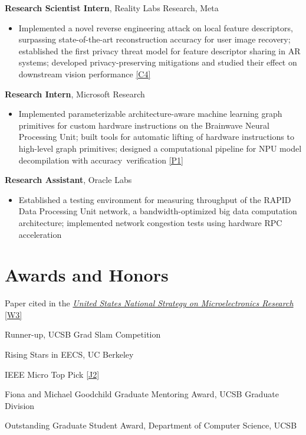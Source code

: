 \documentclass[11pt,letterpaper]{article}
\newcommand{\pref}[1]{\hyperlink{pub:#1}{[#1]}}
\begin{document}
\begin{yearlist}
\item[2020--21] \textbf{Research Scientist Intern}, Reality Labs Research, Meta
  \begin{itemize}
  \item Implemented a novel reverse engineering attack on local feature descriptors, surpassing state-of-the-art reconstruction accuracy for user image recovery; established the first privacy threat model for feature descriptor sharing in AR systems; developed privacy-preserving mitigations and studied their effect on downstream vision performance \pref{C4}
  \end{itemize}
\item[2018] \textbf{Research Intern}, Microsoft Research
  \begin{itemize}
  \item Implemented parameterizable architecture-aware machine learning graph primitives for custom hardware instructions on the Brainwave Neural Processing Unit; built tools for automatic lifting of hardware instructions to high-level graph primitives; designed a computational pipeline for NPU model decompilation with \mbox{accuracy verification} \pref{P1}
  \end{itemize}
\item[2016] \textbf{Research Assistant}, Oracle Labs
  \begin{itemize}
  \item Established a testing environment for measuring throughput of the RAPID Data Processing Unit network, a bandwidth-optimized big data computation architecture; implemented network congestion tests using hardware RPC acceleration
  \end{itemize}
\end{yearlist}

\section{Awards and Honors}

\begin{yearlist}
\item[2024] Paper cited in the \href{https://www.nitrd.gov/pubs/National-Strategy-on-Microelectronics-Research-March-2024.pdf}{\emph{United States National Strategy on Microelectronics Research}} \pref{W3}
\item[2021] Runner-up, UCSB Grad Slam Competition
\item[2020] Rising Stars in EECS, UC Berkeley
\item[2020] IEEE Micro Top Pick \pref{J2}
\item[2020] Fiona and Michael Goodchild Graduate Mentoring Award, UCSB Graduate Division
\item[2020] Outstanding Graduate Student Award, Department of Computer Science, UCSB
\end{yearlist}
\end{document}

